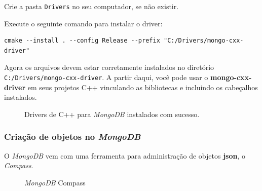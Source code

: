 \documentclass[a4paper,11pt]{article}
\newcommand{\mongo}{\textit{MongoDB}}
\begin{document}
Crie a pasta {\tt Drivers} no seu computador, se não existir.

Execute o seguinte comando para instalar o driver:
\begin{mdframed}
	\begin{verbatim}
cmake --install . --config Release --prefix "C:/Drivers/mongo-cxx-driver"
	\end{verbatim}
\end{mdframed}

Agora os arquivos devem estar corretamente instalados no diretório {\tt C:/Drivers/mongo-cxx-driver}. A partir daqui, você pode usar o \textbf{mongo-cxx-driver} em seus projetos C++ vinculando as bibliotecas e incluindo os cabeçalhos instalados.

\begin{figure}[H]
	\centering
	\caption{Drivers de C++ para \mongo{} instalados com sucesso.}\label{fig:mongodb_drivers}
\end{figure}

\subsubsection{Criação de objetos no \mongo{}}

O \mongo{} vem com uma ferramenta para administração de objetos \textbf{json}, o \textit{Compass}.
\begin{figure}[H]
	\centering
	\caption{\mongo{} Compass}\label{fig:mongo_compass}
\end{figure}
\end{document}
